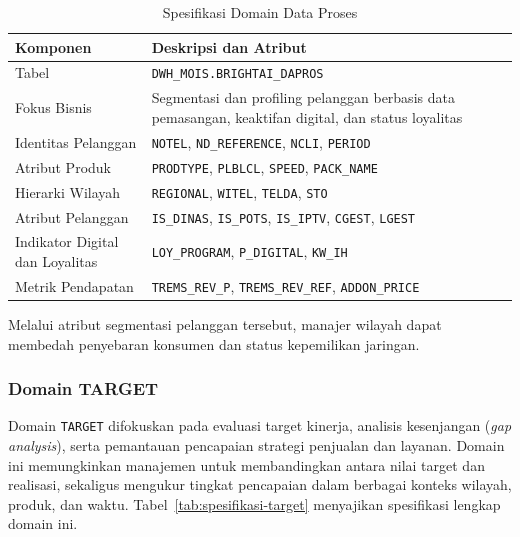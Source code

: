 \begin{table}[htbp]
\centering
\caption{Spesifikasi Domain Data Proses}
\label{tab:spesifikasi-dapros}
\begin{tabular}{|p{4cm}|p{9cm}|}
\hline
\textbf{Komponen} & \textbf{Deskripsi dan Atribut} \\
\hline
Tabel & \texttt{DWH\_MOIS.BRIGHTAI\_DAPROS} \\
\hline
Fokus Bisnis & Segmentasi dan profiling pelanggan berbasis data pemasangan, keaktifan digital, dan status loyalitas \\
\hline
Identitas Pelanggan & \texttt{NOTEL}, \texttt{ND\_REFERENCE}, \texttt{NCLI}, \texttt{PERIOD} \\
\hline
Atribut Produk & \texttt{PRODTYPE}, \texttt{PLBLCL}, \texttt{SPEED}, \texttt{PACK\_NAME} \\
\hline
Hierarki Wilayah & \texttt{REGIONAL}, \texttt{WITEL}, \texttt{TELDA}, \texttt{STO} \\
\hline
Atribut Pelanggan & \texttt{IS\_DINAS}, \texttt{IS\_POTS}, \texttt{IS\_IPTV}, \texttt{CGEST}, \texttt{LGEST} \\
\hline
Indikator Digital dan Loyalitas & \texttt{LOY\_PROGRAM}, \texttt{P\_DIGITAL}, \texttt{KW\_IH} \\
\hline
Metrik Pendapatan & \texttt{TREMS\_REV\_P}, \texttt{TREMS\_REV\_REF}, \texttt{ADDON\_PRICE} \\
\hline
\end{tabular}
\end{table}

Melalui atribut segmentasi pelanggan tersebut, manajer wilayah dapat membedah penyebaran konsumen dan status kepemilikan jaringan.

\subsubsection{Domain TARGET}

Domain \texttt{TARGET} difokuskan pada evaluasi target kinerja, analisis kesenjangan (\textit{gap analysis}), serta pemantauan pencapaian strategi penjualan dan layanan. Domain ini memungkinkan manajemen untuk membandingkan antara nilai target dan realisasi, sekaligus mengukur tingkat pencapaian dalam berbagai konteks wilayah, produk, dan waktu. Tabel~\ref{tab:spesifikasi-target} menyajikan spesifikasi lengkap domain ini.


